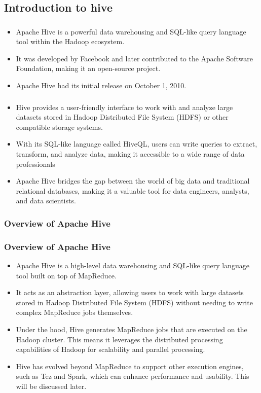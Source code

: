 \subsection{Introduction to hive}
\begin{frame}
\frametitle{\subsecname}
\begin{itemize} 
	\item Apache Hive is a powerful data warehousing and SQL-like query language tool within the Hadoop ecosystem.\pause
	\item It was developed by Facebook and later contributed to the Apache Software Foundation, making it an open-source project.\pause
	\item Apache Hive had its initial release on October 1, 2010.	\pause
\end{itemize}
\end{frame}

\begin{frame}
	\frametitle{\subsecname}
	\begin{itemize} 
		\item Hive provides a user-friendly interface to work with and analyze large datasets stored in Hadoop Distributed File System (HDFS) or other compatible storage systems.\pause
		\item With its SQL-like language called HiveQL, users can write queries to extract, transform, and analyze data, making it accessible to a wide range of data professionals\pause
		\item Apache Hive bridges the gap between the world of big data and traditional relational databases, making it a valuable tool for data engineers, analysts, and data scientists.\pause	
	\end{itemize}
	\end{frame}


\subsubsection{Overview of Apache Hive}
\begin{frame}
\frametitle{Overview of Apache Hive}
\begin{itemize} 
	\item Apache Hive is a high-level data warehousing and SQL-like query language tool built on top of MapReduce.\pause
	\item It acts as an abstraction layer, allowing users to work with large datasets stored in Hadoop Distributed File System (HDFS) without needing to write complex MapReduce jobs themselves.\pause
	\item Under the hood, Hive generates MapReduce jobs that are executed on the Hadoop cluster. This means it leverages the distributed processing capabilities of Hadoop for scalability and parallel processing.\pause
	\item Hive has evolved beyond MapReduce to support other execution engines, such as Tez and Spark, which can enhance performance and usability. This will be discussed later.\pause

\end{itemize}
\end{frame}

